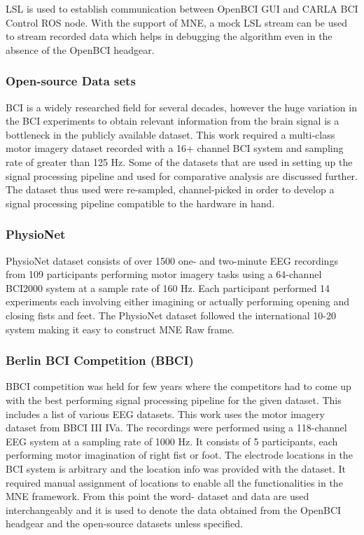 LSL is used to establish communication between OpenBCI GUI and CARLA BCI Control ROS node. With the support of MNE, a mock LSL stream can be used to stream recorded data which helps in debugging the algorithm even in the absence of the OpenBCI headgear.

\subsubsection{Open-source Data sets}
BCI is a widely researched field for several decades, however the huge variation in the BCI experiments to obtain relevant information from the brain signal is a bottleneck in the publicly available dataset. This work required a multi-class motor imagery dataset recorded with a 16+ channel BCI system and sampling rate of greater than 125 Hz. Some of the datasets that are used in setting up the signal processing pipeline and used for comparative analysis are discussed further. The dataset thus used were re-sampled, channel-picked in order to develop a signal processing pipeline compatible to the hardware in hand.

\subsubsection{PhysioNet}
PhysioNet dataset\cite{2004_Physionet} consists of over 1500 one- and two-minute EEG recordings from 109 participants performing motor imagery tasks using a 64-channel BCI2000 system at a sample rate of 160 Hz. Each participant performed 14 experiments each involving either imagining or actually performing opening and closing fists and feet. The PhysioNet dataset followed the international 10-20 system making it easy to construct MNE Raw frame.

\subsubsection{Berlin BCI Competition (BBCI)}
BBCI \cite{2004_BBCI} competition was held for few years where the competitors had to come up with the best performing signal processing pipeline for the given dataset. This includes a list of various EEG datasets. This work uses the motor imagery dataset from BBCI III IVa. The recordings were performed using a 118-channel EEG system at a sampling rate of 1000 Hz. It consists of 5 participants, each performing motor imagination of right fist or foot. The electrode locations in the BCI system is arbitrary and the location info was provided with the dataset. It required manual assignment of locations to enable all the functionalities in the MNE framework. From this point the word- dataset and data are used interchangeably and it is used to denote the data obtained from the OpenBCI headgear and the open-source datasets unless specified.

